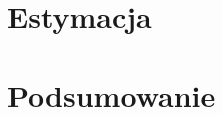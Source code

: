\documentclass[12pt,a4paper]{article}
\begin{document}
\section{Estymacja}
\section{Podsumowanie}
\end{document}
